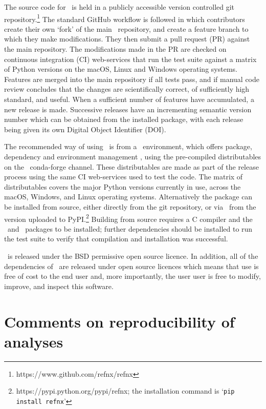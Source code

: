 \documentclass[pdf,preprint]{iucr}
\begin{document}
The source code for \ is held in a publicly accessible version controlled git repository.\footnote{https://www.github.com/refnx/refnx} The standard GitHub workflow is followed in which contributors create their own `fork' of the main \ repository, and create a feature branch to which they make modifications. They then submit a pull request (PR) against the main repository. The modifications made in the PR are checked on continuous integration (CI) web-services that run the test suite against a matrix of Python versions on the macOS, Linux and Windows operating systems. Features are merged into the main repository if all tests pass, and if manual code review concludes that the changes are scientifically correct, of sufficiently high standard, and useful. When a sufficient number of features have accumulated, a new release is made. Successive releases have an incrementing semantic version number which can be obtained from the installed package, with each release being given its own Digital Object Identifier (DOI).

The recommended way of using \ is from a \conda\ environment, which offers package, dependency and environment management \cite{conda}, using the pre-compiled distributables on the \ conda-forge channel. These distributables are made as part of the release process using the same CI web-services used to test the code. The matrix of distributables covers the major Python versions currently in use, across the macOS, Windows, and Linux operating systems. Alternatively the package can be installed from source, either directly from the git repository, or via \pip\ from the version uploaded to PyPI.\footnote{https://pypi.python.org/pypi/refnx; the installation command is `\texttt{pip install refnx}'} Building from source requires a C compiler and the \Cython\ and \NumPy\ packages to be installed; further dependencies should be installed to run the test suite to verify that compilation and installation was successful.

\ is released under the BSD permissive open source licence. In addition, all of the  dependencies of \ are released under open source licences which means that use is free of cost to the end user and, more importantly, the user user is free to modify, improve, and inspect this software.

\section{Comments on reproducibility of analyses}
\end{document}
